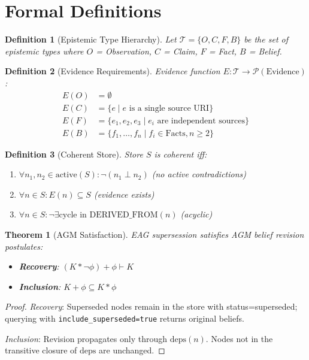 \documentclass[11pt,letterpaper]{article}
\newtheorem{definition}{Definition}[section]
\newtheorem{theorem}{Theorem}[section]
\begin{document}
\section{Formal Definitions}
\label{app:formal}

\begin{definition}[Epistemic Type Hierarchy]
\label{def:types}
Let $\mathcal{T} = \{O, C, F, B\}$ be the set of epistemic types where $O$ = Observation, $C$ = Claim, $F$ = Fact, $B$ = Belief.
\end{definition}

\begin{definition}[Evidence Requirements]
\label{def:evidence}
Evidence function $E: \mathcal{T} \to \mathcal{P}(\text{Evidence})$:
\begin{align*}
E(O) &= \emptyset \\
E(C) &= \{e \mid e \text{ is a single source URI}\} \\
E(F) &= \{e_1, e_2, e_3 \mid e_i \text{ are independent sources}\} \\
E(B) &= \{f_1, \ldots, f_n \mid f_i \in \text{Facts}, n \geq 2\}
\end{align*}
\end{definition}

\begin{definition}[Coherent Store]
\label{def:coherent}
Store $S$ is coherent iff:
\begin{enumerate}[noitemsep]
    \item $\forall n_1, n_2 \in \text{active}(S): \neg(n_1 \perp n_2)$ (no active contradictions)
    \item $\forall n \in S: E(n) \subseteq S$ (evidence exists)
    \item $\forall n \in S: \neg\exists \text{cycle in DERIVED\_FROM}(n)$ (acyclic)
\end{enumerate}
\end{definition}

\begin{theorem}[AGM Satisfaction]
\label{thm:agm}
EAG supersession satisfies AGM belief revision postulates:
\begin{itemize}[noitemsep]
    \item \textbf{Recovery}: $(K * \neg\phi) + \phi \vdash K$
    \item \textbf{Inclusion}: $K + \phi \subseteq K * \phi$
\end{itemize}
\end{theorem}

\begin{proof}
\textit{Recovery}: Superseded nodes remain in the store with status=superseded; querying with \texttt{include\_superseded=true} returns original beliefs.

\textit{Inclusion}: Revision propagates only through $\text{deps}(n)$. Nodes not in the transitive closure of $\text{deps}$ are unchanged.
\end{proof}
\end{document}
